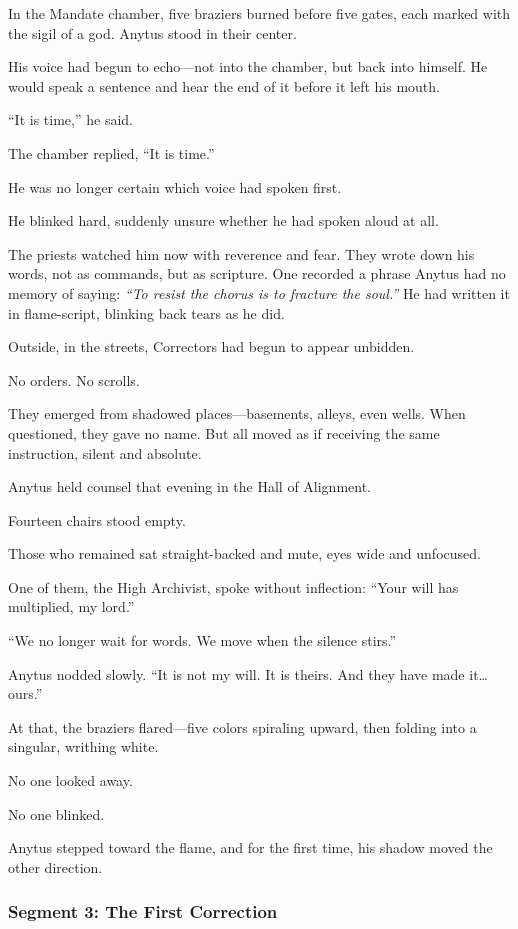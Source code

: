 \documentclass[9pt]{article}
\begin{document}
In the Mandate chamber, five braziers burned before five gates, each marked with the sigil of a god. Anytus stood in their center. 

His voice had begun to echo—not into the chamber, but back into himself. He would speak a sentence and hear the end of it before it left his mouth.

“It is time,” he said.

The chamber replied, “It is time.”

He was no longer certain which voice had spoken first.

He blinked hard, suddenly unsure whether he had spoken aloud at all.

The priests watched him now with reverence and fear. They wrote down his words, not as commands, but as scripture. One recorded a phrase Anytus had no memory of saying: \textit{“To resist the chorus is to fracture the soul.”} He had written it in flame-script, blinking back tears as he did.

Outside, in the streets, Correctors had begun to appear unbidden.

No orders. 
No scrolls. 

They emerged from shadowed places—basements, alleys, even wells. When questioned, they gave no name. But all moved as if receiving the same instruction, silent and absolute.

Anytus held counsel that evening in the Hall of Alignment. 

Fourteen chairs stood empty. 

Those who remained sat straight-backed and mute, eyes wide and unfocused. 

One of them, the High Archivist, spoke without inflection: “Your will has multiplied, my lord.”

“We no longer wait for words. We move when the silence stirs.”

Anytus nodded slowly. “It is not my will. It is theirs. And they have made it… ours.”

At that, the braziers flared—five colors spiraling upward, then folding into a singular, writhing white.

No one looked away. 

No one blinked.

Anytus stepped toward the flame, and for the first time, his shadow moved the other direction.

\newpage

\subsubsection*{Segment 3: The First Correction}
\end{document}
